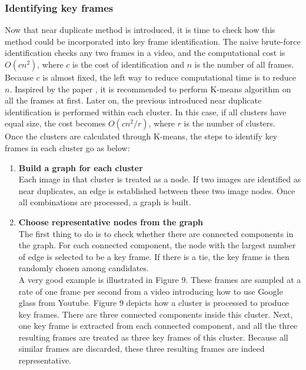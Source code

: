 \subsubsection{Identifying key frames} 
Now that near duplicate method is introduced, it is time to check how this method could be incorporated into key frame identification. The naive brute-force identification checks any two frames in a video, and the computational cost is $O(cn^2)$, where $c$ is the cost of identification and $n$ is the number of all frames. Because $c$ is almost fixed, the left way to reduce computational time is to reduce $n$. Inspired by the paper \cite{wang2012event}, it is recommended to perform K-means algorithm on all the frames at first. Later on, the previous introduced near duplicate identification is performed within each cluster. In this case, if all clusters have equal size, the cost becomes $O(cn^2/r)$, where $r$ is the number of clusters.\\

\noindent Once the clusters are calculated through K-means, the steps to identify key frames in each cluster go as below:

\begin{enumerate}
  \item{\bfseries Build a graph for each cluster}\\
  Each image in that cluster is treated as a node. If two images are identified as near duplicates, an edge is established between these two image nodes. Once all combinations are processed, a graph is built.

  \item{\bfseries Choose representative nodes from the graph}\\
  The first thing to do is to check whether there are connected components in the graph. For each connected component, the node with the largest number of edge is selected to be a key frame. If there is a tie, the key frame is then randomly chosen among candidates. \\

  A very good example is illustrated in Figure 9. These frames are sampled at a rate of one frame per second from a video introducing how to use Google glass from Youtube. Figure 9 depicts how a cluster is processed to produce key frames. There are three connected components inside this cluster. Next, one key frame is extracted from each connected component, and all the three resulting frames are treated as three key frames of this cluster. Because all similar frames are discarded, these three resulting frames are indeed representative. 
\end{enumerate}

